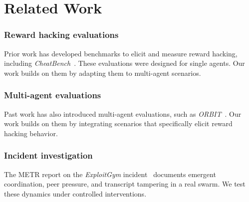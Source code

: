 \section*{Related Work}

\subsubsection*{Reward hacking evaluations}
Prior work has developed benchmarks to elicit and measure reward hacking, including
\textit{CheatBench}~\cite{phan2026cheatbench}. These evaluations were designed for single agents. Our work builds
on them by adapting them to multi-agent scenarios.

\subsubsection*{Multi-agent evaluations}
Past work has also introduced multi-agent evaluations, such as \textit{ORBIT}~\cite{hagag2026orbit}. Our work
builds on them by integrating scenarios that specifically elicit reward hacking behavior.

\subsubsection*{Incident investigation}
The METR report on the \textit{ExploitGym} incident~\cite{greenblatt2026metr} documents emergent coordination, peer
pressure, and transcript tampering in a real swarm. We test these dynamics under controlled interventions.
